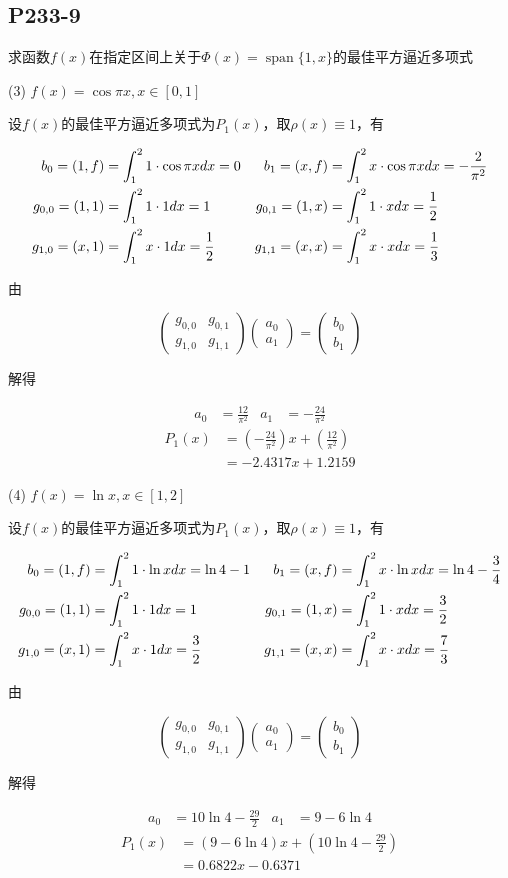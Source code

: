 \subsection{P233-9}
求函数$f(x)$在指定区间上关于$\Phi(x)=\operatorname{span}\{1,x\}$的最佳平方逼近多项式
\renewcommand{\COEFFICIENTS}[5]{
\begin{align*}
b_{0}   = \FUNCDOT{1}{f} & = \INTRANGE{1 \cdot \FX}{x} = #1 &
b_{1}   = \FUNCDOT{x}{f} & = \INTRANGE{x \cdot \FX}{x} = #2 \\
g_{0,0} = \FUNCDOT{1}{1} & = \INTRANGE{1 \cdot 1}{x}   = #3 &
g_{0,1} = \FUNCDOT{1}{x} & = \INTRANGE{1 \cdot x}{x}   = #4 \\
g_{1,0} = \FUNCDOT{x}{1} & = \INTRANGE{x \cdot 1}{x}   = #4 &
g_{1,1} = \FUNCDOT{x}{x} & = \INTRANGE{x \cdot x}{x}   = #5
\end{align*}
}

\newcommand{\EQUATION}{
\begin{displaymath}
\begin{pmatrix}
g_{0,0} &
g_{0,1} \\
g_{1,0} &
g_{1,1}
\end{pmatrix}
\begin{pmatrix}
a_{0} \\
a_{1}
\end{pmatrix}
=
\begin{pmatrix}
b_{0} \\
b_{1}
\end{pmatrix}
\end{displaymath}
}

\newcommand{\SOLUTION}[4]{
\begin{align*}
a_{0}  & = #1 &
a_{1}  & = #2
\end{align*}
\begin{align*}
P_1(x) & = (#2) x + (#1) \\
       & = #4 x #3
\end{align*}
}

\newcommand{\PATTERN}[9]{
$f(x) = \FX, x \in [\LRANGE, \RRANGE]$
\begin{SOLVE}
设$f(x)$的最佳平方逼近多项式为$P_1(x)$，取$\rho(x) \equiv 1$，有
\COEFFICIENTS{#1}{#2}{#3}{#4}{#5}
由
\EQUATION
解得
\SOLUTION{#6}{#7}{#8}{#9}
\end{SOLVE}
}



\renewcommand{\FX}{\cos {\pi x}}
\renewcommand{\LRANGE}{0}
\renewcommand{\RRANGE}{1}
(3) \PATTERN{0}{-\frac{2}{\pi^2}}{1}{\frac{1}{2}}{\frac{1}{3}}{\frac{12}{\pi^2}}{-\frac{24}{\pi^2}}{+ 1.2159}{- 2.4317}

\renewcommand{\FX}{\ln x}
\renewcommand{\LRANGE}{1}
\renewcommand{\RRANGE}{2}
(4) \PATTERN{\ln 4 - 1}{\ln 4 - \frac{3}{4}}{1}{\frac{3}{2}}{\frac{7}{3}}{10 \ln 4 - \frac{29}{2}}{9 - 6 \ln 4}{-0.6371}{0.6822}